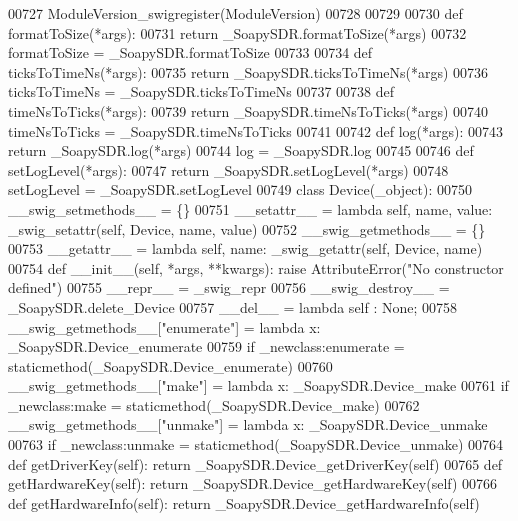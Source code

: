 \begin{DoxyCode}
{{{{{00727 ModuleVersion_swigregister(ModuleVersion)
00728 
00729 
00730 \textcolor{keyword}{def }formatToSize(*args):
00731   \textcolor{keywordflow}{return} \_SoapySDR.formatToSize(*args)
00732 formatToSize = \_SoapySDR.formatToSize
00733 
00734 \textcolor{keyword}{def }ticksToTimeNs(*args):
00735   \textcolor{keywordflow}{return} \_SoapySDR.ticksToTimeNs(*args)
00736 ticksToTimeNs = \_SoapySDR.ticksToTimeNs
00737 
00738 \textcolor{keyword}{def }timeNsToTicks(*args):
00739   \textcolor{keywordflow}{return} \_SoapySDR.timeNsToTicks(*args)
00740 timeNsToTicks = \_SoapySDR.timeNsToTicks
00741 
00742 \textcolor{keyword}{def }log(*args):
00743   \textcolor{keywordflow}{return} \_SoapySDR.log(*args)
00744 log = \_SoapySDR.log
00745 
00746 \textcolor{keyword}{def }setLogLevel(*args):
00747   \textcolor{keywordflow}{return} \_SoapySDR.setLogLevel(*args)
00748 setLogLevel = \_SoapySDR.setLogLevel
00749 \textcolor{keyword}{class }Device(_object):
00750     \_\_swig\_setmethods\_\_ = \{\}
00751     \_\_setattr\_\_ = \textcolor{keyword}{lambda} self, name, value: _swig_setattr(self, Device, name, value)
00752     \_\_swig\_getmethods\_\_ = \{\}
00753     \_\_getattr\_\_ = \textcolor{keyword}{lambda} self, name: _swig_getattr(self, Device, name)
00754     \textcolor{keyword}{def }__init__(self, *args, **kwargs): \textcolor{keywordflow}{raise} AttributeError(\textcolor{stringliteral}{"No constructor defined"})
00755     \_\_repr\_\_ = \_swig\_repr
00756     \_\_swig\_destroy\_\_ = \_SoapySDR.delete\_Device
00757     \_\_del\_\_ = \textcolor{keyword}{lambda} self : \textcolor{keywordtype}{None};
00758     \_\_swig\_getmethods\_\_[\textcolor{stringliteral}{"enumerate"}] = \textcolor{keyword}{lambda} x: \_SoapySDR.Device\_enumerate
00759     \textcolor{keywordflow}{if} \_newclass:enumerate = staticmethod(\_SoapySDR.Device\_enumerate)
00760     \_\_swig\_getmethods\_\_[\textcolor{stringliteral}{"make"}] = \textcolor{keyword}{lambda} x: \_SoapySDR.Device\_make
00761     \textcolor{keywordflow}{if} \_newclass:make = staticmethod(\_SoapySDR.Device\_make)
00762     \_\_swig\_getmethods\_\_[\textcolor{stringliteral}{"unmake"}] = \textcolor{keyword}{lambda} x: \_SoapySDR.Device\_unmake
00763     \textcolor{keywordflow}{if} \_newclass:unmake = staticmethod(\_SoapySDR.Device\_unmake)
00764     \textcolor{keyword}{def }getDriverKey(self): \textcolor{keywordflow}{return} \_SoapySDR.Device\_getDriverKey(self)
00765     \textcolor{keyword}{def }getHardwareKey(self): \textcolor{keywordflow}{return} \_SoapySDR.Device\_getHardwareKey(self)
00766     \textcolor{keyword}{def }getHardwareInfo(self): \textcolor{keywordflow}{return} \_SoapySDR.Device\_getHardwareInfo(self)
}}}}}
\end{DoxyCode}
